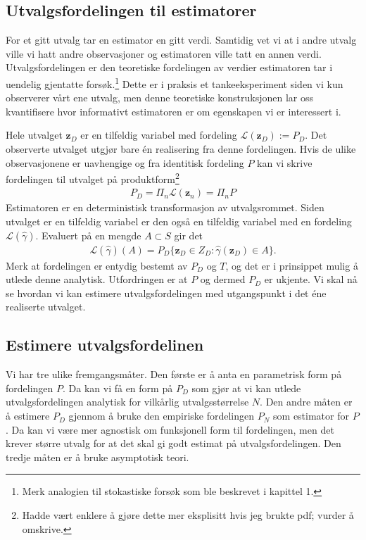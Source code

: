 \subsection{Utvalgsfordelingen til estimatorer}
For et gitt utvalg tar en estimator en gitt verdi. Samtidig vet vi at i andre utvalg ville vi hatt andre observasjoner og estimatoren ville tatt en annen verdi. Utvalgsfordelingen er den teoretiske fordelingen av verdier estimatoren tar i uendelig gjentatte forsøk.\footnote{Merk analogien til stokastiske forsøk som ble beskrevet i kapittel 1.} Dette er i praksis et tankeeksperiment siden vi kun observerer vårt ene utvalg, men denne teoretiske konstruksjonen lar oss kvantifisere hvor informativt estimatoren er om egenskapen vi er interessert i. 

Hele utvalget $\mathbf{z}_D$ er en tilfeldig variabel med fordeling $\mathcal{L}(\mathbf{z}_D) := P_D$. Det observerte utvalget utgjør bare én realisering fra denne fordelingen. Hvis de ulike observasjonene er uavhengige og fra identitisk fordeling $P$ kan vi skrive fordelingen til utvalget på produktform\footnote{Hadde vært enklere å gjøre dette mer eksplisitt hvis jeg brukte pdf; vurder å omskrive.}
\begin{align}
P_D = \Pi_n\mathcal{L}(\mathbf{z}_n)=\Pi_nP
\end{align}
Estimatoren er en deterministisk transformasjon av utvalgsrommet. Siden utvalget er en tilfeldig variabel er den også en tilfeldig variabel med en fordeling $\mathcal{L}(\hat{\gamma})$. Evaluert på en mengde $A\subset S$ gir det
\begin{align}
\mathcal{L}(\hat{\gamma})(A)= P_D\{\mathbf{z}_D \in Z_D : \hat{\gamma}(\mathbf{z}_D) \in A\}.
\end{align}
Merk at fordelingen er entydig bestemt av $P_D$ og $T$, og det er i prinsippet mulig å utlede denne analytisk. Utfordringen er at $P$ og dermed $P_D$ er ukjente. Vi skal nå se hvordan vi kan estimere utvalgsfordelingen med utgangspunkt i det éne realiserte utvalget.
\subsection{Estimere utvalgsfordelinen}
Vi har tre ulike fremgangsmåter. Den første er å anta en parametrisk form på fordelingen $P$. Da kan vi få en form på $P_D$ som gjør at vi kan utlede utvalgsfordelingen analytisk for vilkårlig utvalgsstørrelse $N$. Den andre måten er å estimere $P_D$ gjennom å bruke den empiriske fordelingen $P_N$ som estimator for $P$. Da kan vi være mer agnostisk om funksjonell form til fordelingen, men det krever større utvalg for at det skal gi godt estimat på utvalgsfordelingen. Den tredje måten er å bruke asymptotisk teori.
